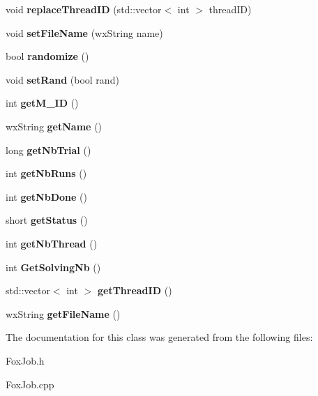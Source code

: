 \begin{DoxyCompactItemize}
void {\bfseries replace\+Thread\+ID} (std\+::vector$<$ int $>$ thread\+ID)
\item 
\mbox{\label{class_fox_job_a6d5383178b541be6fa527184782877b0}} 
void {\bfseries set\+File\+Name} (wx\+String name)
\item 
\mbox{\label{class_fox_job_ae0ff84cd7d105b39aa12c7b253382a8e}} 
bool {\bfseries randomize} ()
\item 
\mbox{\label{class_fox_job_a15b4cffa2253c5ecef0c59e6c39f8397}} 
void {\bfseries set\+Rand} (bool rand)
\item 
\mbox{\label{class_fox_job_a0b0b741d1d938aa6f31ff2ca707c7494}} 
int {\bfseries get\+M\+\_\+\+ID} ()
\item 
\mbox{\label{class_fox_job_a56b44b5ea5d921a5b970952001abf6d1}} 
wx\+String {\bfseries get\+Name} ()
\item 
\mbox{\label{class_fox_job_a6247c308407e2e229d17821cca175e1f}} 
long {\bfseries get\+Nb\+Trial} ()
\item 
\mbox{\label{class_fox_job_aad9ac02fff29ebea7699e23399972af8}} 
int {\bfseries get\+Nb\+Runs} ()
\item 
\mbox{\label{class_fox_job_a5d51e7f3d1de5611cae3643920ba5149}} 
int {\bfseries get\+Nb\+Done} ()
\item 
\mbox{\label{class_fox_job_ac140f8e344194c7932c3efc82e331bfa}} 
short {\bfseries get\+Status} ()
\item 
\mbox{\label{class_fox_job_a0a7ba68a5980f02c15fcbc8e93dd5c96}} 
int {\bfseries get\+Nb\+Thread} ()
\item 
\mbox{\label{class_fox_job_ae6f8d62c093d947018f64a9f5971f7e0}} 
int {\bfseries Get\+Solving\+Nb} ()
\item 
\mbox{\label{class_fox_job_a2c7af711f5bcc7ed82e9763d333928d9}} 
std\+::vector$<$ int $>$ {\bfseries get\+Thread\+ID} ()
\item 
\mbox{\label{class_fox_job_a4a94b07fc37251dc4e2d8085da44fa22}} 
wx\+String {\bfseries get\+File\+Name} ()
\end{DoxyCompactItemize}


The documentation for this class was generated from the following files\+:\begin{DoxyCompactItemize}
\item 
Fox\+Job.\+h\item 
Fox\+Job.\+cpp\end{DoxyCompactItemize}
